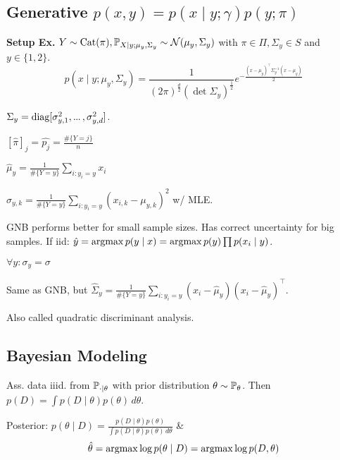 \subsection[Generative]{Generative \(p(x, y) = p(x \mid y; \gamma) p(y; \pi)\)}
\textbf{Setup Ex.} \(Y \sim \cat(\pi), \P_{X \mid y; \mu_y, \Sigma_y} \sim \normal(\mu_y, \Sigma_y)\) with \(\pi \in \Pi, \Sigma_y \in S\) and \( y \in \{1, 2\}\).
\[p(x \mid y; \mu_y, \Sigma_y) = \frac{1}{(2\pi)^{\frac{d}{2}}(\det \Sigma_y)^{\frac{1}{2}}} e^{- \frac{(x - \mu_y)^\top \Sigma_y^{-1} (x - \mu_y)}{2}}\]

\begin{definition}
  \(\Sigma_y = \text{diag}[\sigma_{y,1}^2, \sdots, \sigma_{y,d}^2]\).
  \begin{enumerate*}
    \item \([\hat{\pi}]_j = \hat{p_j} = \frac{\#\{Y = j\}}{n}\)
    \item \(\hat{\mu}_y = \frac{1}{\#\{Y = y\}} \sum_{i:y_i = y} x_i\)
    \item \(\hat{\sigma}_{y, k} = \frac{1}{\#\{Y = y\}} \sum_{i:y_i = y} (x_{i, k} - \mu_{y, k})^2\) w/ MLE.
  \end{enumerate*}
  GNB performs better for small sample sizes. Has correct uncertainty for big samples. If iid:
  \(\hat{y} = \argmax p(y \mid x) = \argmax p(y) \prod p(x_i \mid y)\).
\end{definition}

\begin{definition}
  \(\forall y: \sigma_y = \sigma\)
\end{definition}

\pagebreak
\begin{definition}
  Same as GNB, but \(\hat{\Sigma}_y = \frac{1}{\#\{Y = y\}}\sum_{i:y_i = y} (x_i - \hat{\mu}_y)(x_i - \hat{\mu}_y)^\top\).
  
  Also called quadratic discriminant analysis.
\end{definition}

\subsection{Bayesian Modeling}
Ass. data iiid. from \(\P_{\cdot \mid \theta}\) with prior distribution \(\theta \sim \P_\theta\). Then \(p(D) = \int p(D \mid \theta) p(\theta) \, d\theta\).

\begin{definition}[MAP]
  Posterior: \(p(\theta \mid D) = \frac{p(D \mid \theta) p(\theta)}{\int p(D \mid \theta) p(\theta) \, d\theta}\) \&
  \[\hat{\theta} = \argmax \log p(\theta \mid D) = \argmax \log p(D, \theta)\]
\end{definition}

